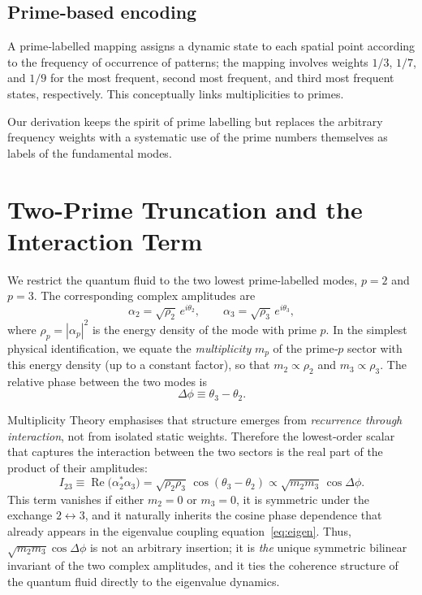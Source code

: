 \documentclass[11pt,a4paper]{article}
\theoremstyle{definition}
\theoremstyle{remark}
\begin{document}
\subsection{Prime‑based encoding}
A prime‑labelled mapping assigns a dynamic state to each spatial point according to the frequency of occurrence of patterns; the mapping involves weights $1/3$, $1/7$, and $1/9$ for the most frequent, second most frequent, and third most frequent states, respectively. This conceptually links multiplicities to primes.

Our derivation keeps the spirit of prime labelling but replaces the arbitrary frequency weights with a systematic use of the prime numbers themselves as labels of the fundamental modes.

\section{Two-Prime Truncation and the Interaction Term}
We restrict the quantum fluid to the two lowest prime‑labelled modes, $p=2$ and $p=3$.
The corresponding complex amplitudes are
\begin{equation}
\alpha_2 = \sqrt{\rho_2}\,e^{i\theta_2},\qquad 
\alpha_3 = \sqrt{\rho_3}\,e^{i\theta_3},
\end{equation}
where $\rho_p = |\alpha_p|^2$ is the energy density of the mode with prime $p$.
In the simplest physical identification, we equate the \textit{multiplicity} $m_p$ of the prime‑$p$ sector with this energy density (up to a constant factor), so that $m_2\propto\rho_2$ and $m_3\propto\rho_3$.
The relative phase between the two modes is
\[
\Delta\phi \equiv \theta_3-\theta_2.
\]

Multiplicity Theory emphasises that structure emerges from \textit{recurrence through interaction}, not from isolated static weights.
Therefore the lowest‑order scalar that captures the interaction between the two sectors is the real part of the product of their amplitudes:
\begin{equation}
I_{23} \equiv \operatorname{Re}\bigl(\alpha_2^*\alpha_3\bigr) 
= \sqrt{\rho_2\rho_3}\,\cos(\theta_3-\theta_2)
\propto \sqrt{m_2 m_3}\,\cos\Delta\phi.
\label{eq:inter}
\end{equation}
This term vanishes if either $m_2=0$ or $m_3=0$, it is symmetric under the exchange $2\leftrightarrow 3$, and it naturally inherits the cosine phase dependence that already appears in the eigenvalue coupling equation~\eqref{eq:eigen}.
Thus, $\sqrt{m_2 m_3}\cos\Delta\phi$ is not an arbitrary insertion; it is \textit{the} unique symmetric bilinear invariant of the two complex amplitudes, and it ties the coherence structure of the quantum fluid directly to the eigenvalue dynamics.
\end{document}
